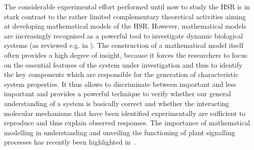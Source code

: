 \documentclass[oneside, 10pt, a4paper, twocolumn]{article}
\begin{document}
The considerable experimental effort performed until now to study the HSR is in stark contrast to the
rather limited complementary theoretical activities aiming at developing mathematical models
of the HSR. However, mathematical models are increasingly recognised as a powerful tool to
investigate dynamic biological systems (as reviewed e.g. in \cite{Pfau2011}). 
The construction of a mathematical model itself often provides a high degree of insight,
because it forces the researchers to focus on the essential features of the system under investigation
and thus to identify the key components which are responsible for the generation of characteristic
system properties. It thus allows to discriminate between important and less important
and provides a powerful technique to verify whether our general understanding of a system is
basically correct and whether the interacting molecular mechanisms that have been identified experimentally
are sufficient to reproduce and thus explain observed responses.
The importance of mathematical modelling in understanding and unveiling the functioning of plant signalling processes 
has recently been highlighted in~\cite{Chew2014}.
\end{document}

